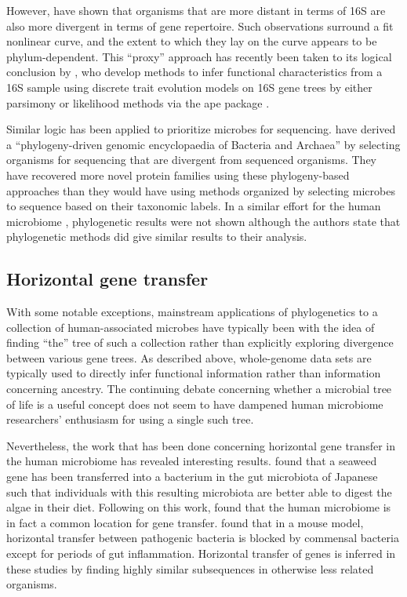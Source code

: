 \documentclass{amsart}
\begin{document}
However, \citet{zaneveld2010ribosomal} have shown that organisms that are more distant in terms of 16S are also more divergent in terms of gene repertoire.
Such observations surround a fit nonlinear curve, and the extent to which they lay on the curve appears to be phylum-dependent.
This ``proxy'' approach has recently been taken to its logical conclusion by \citet{langille2013predictive}, who develop methods to infer functional characteristics from a 16S sample using discrete trait evolution models on 16S gene trees by either parsimony \citep{kluge1969quantitative} or likelihood \citep{pagel1994detecting} methods via the ape package \citep{paradis2004ape}.

Similar logic has been applied to prioritize microbes for sequencing.
\citet{wu2009phylogeny} have derived a ``phylogeny-driven genomic encyclopaedia of Bacteria and Archaea'' by selecting organisms for sequencing that are divergent from sequenced organisms.
They have recovered more novel protein families using these phylogeny-based approaches than they would have using methods organized by selecting microbes to sequence based on their taxonomic labels.
In a similar effort for the human microbiome \citep{fodor2012most}, phylogenetic results were not shown although the authors state that phylogenetic methods did give similar results to their analysis.


\subsection{Horizontal gene transfer}
With some notable exceptions, mainstream applications of phylogenetics to a collection of human-associated microbes have typically been with the idea of finding ``the'' tree of such a collection rather than explicitly exploring divergence between various gene trees.
As described above, whole-genome data sets are typically used to directly infer functional information rather than information concerning ancestry.
The continuing debate concerning whether a microbial tree of life is a useful concept \citep{bapteste2009prokaryotic,caro2012bacterial} does not seem to have dampened human microbiome researchers' enthusiasm for using a single such tree.

Nevertheless, the work that has been done concerning horizontal gene transfer in the human microbiome has revealed interesting results.
\citet{hehemann2010transfer} found that a seaweed gene has been transferred into a bacterium in the gut microbiota of Japanese such that individuals with this resulting microbiota are better able to digest the algae in their diet.
Following on this work, \citet{smillie2011ecology} found that the human microbiome is in fact a common location for gene transfer.
\citet{stecher2012gut} found that in a mouse model, horizontal transfer between pathogenic bacteria is blocked by commensal bacteria except for periods of gut inflammation.
Horizontal transfer of genes is inferred in these studies by finding highly similar subsequences in otherwise less related organisms.
\end{document}
